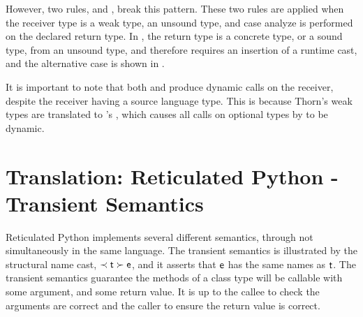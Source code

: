 \documentclass[a4paper,USenglish]{tex/lipics-v2016}
\begin{document}
However, two rules,  and , break this pattern. These
two rules are applied when the receiver type is a weak type, an unsound type,
and case analyze is performed on the declared return type. In ,
the return type is a concrete type, or a sound type,  from an unsound type, and
therefore requires an insertion of a runtime cast, and the alternative case is
shown in .

It is important to note that both  and  produce
dynamic calls on the receiver, despite the  receiver having a source language
type. This is because Thorn's weak types are translated to \kafka's \any, which
causes  all calls on optional types by \kafka to be dynamic.

% 
% 
% 
% 

\section{Translation: Reticulated Python - Transient Semantics}

Reticulated Python implements several different semantics, through not
simultaneously in the same language. The transient semantics is illustrated 
by the structural name cast, $\ShaCast\t\e$, and 
it asserts that ${\sf{e}}$ has the same names as $\t$. The transient
semantics guarantee the methods of a class type will be callable with
some argument, and some return value. It is up to  the callee to check the
arguments are correct and the caller to ensure the return value is correct.
\end{document}

